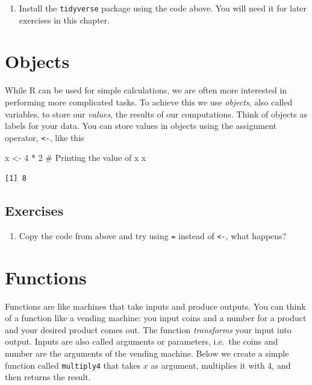 \documentclass[
  letterpaper,
  DIV=11,
  numbers=noendperiod]{scrreprt}
\newenvironment{Shaded}{\begin{snugshade}}{\end{snugshade}}
\newcommand{\CommentTok}[1]{\textcolor[rgb]{0.37,0.37,0.37}{#1}}
\newcommand{\DecValTok}[1]{\textcolor[rgb]{0.68,0.00,0.00}{#1}}
\newcommand{\NormalTok}[1]{\textcolor[rgb]{0.00,0.23,0.31}{#1}}
\newcommand{\OtherTok}[1]{\textcolor[rgb]{0.00,0.23,0.31}{#1}}
\newcommand{\SpecialCharTok}[1]{\textcolor[rgb]{0.37,0.37,0.37}{#1}}
\providecommand{\tightlist}{%
  \setlength{\itemsep}{0pt}\setlength{\parskip}{0pt}}\usepackage{longtable,booktabs,array}
\begin{document}
\begin{enumerate}
\def\labelenumi{\arabic{enumi}.}
\tightlist
\item
  Install the \texttt{tidyverse} package using the code above. You will
  need it for later exercises in this chapter.
\end{enumerate}

\section{Objects}\label{objects}

While R can be used for simple calculations, we are often more
interested in performing more complicated tasks. To achieve this we use
\emph{objects}, also called variables, to store our \emph{values}, the
results of our computations. Think of objects as labels for your data.
You can store values in objects using the assignment operator,
\texttt{\textless{}-}, like this

\begin{Shaded}
\begin{Highlighting}[]
\NormalTok{x }\OtherTok{\textless{}{-}} \DecValTok{4} \SpecialCharTok{*} \DecValTok{2}
\CommentTok{\# Printing the value of x}
\NormalTok{x}
\end{Highlighting}
\end{Shaded}

\begin{verbatim}
[1] 8
\end{verbatim}

\subsection{Exercises}\label{exercises-1}

\begin{enumerate}
\def\labelenumi{\arabic{enumi}.}
\tightlist
\item
  Copy the code from above and try using \texttt{=} instead of
  \texttt{\textless{}-}, what happens?
\end{enumerate}

\section{Functions}\label{functions}

Functions are like machines that take inputs and produce outputs. You
can think of a function like a vending machine: you input coins and a
number for a product and your desired product comes out. The function
\emph{transforms} your input into output. Inputs are also called
arguments or parameters, i.e.~the coins and number are the arguments of
the vending machine. Below we create a simple function called
\texttt{multiply4} that takes \(x\) as argument, multiplies it with 4,
and then returns the result.
\end{document}
